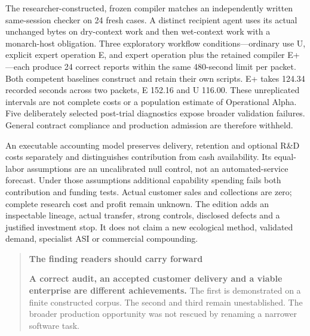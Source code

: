 \documentclass[11pt]{article}
\begin{document}
The researcher-constructed, frozen compiler matches an independently written same-session checker on 24 fresh cases. A distinct recipient agent uses its actual unchanged bytes on dry-context work and then wet-context work with a monarch-host obligation. Three exploratory workflow conditions---ordinary use U, explicit expert operation E, and expert operation plus the retained compiler E+---each produce 24 correct reports within the same 480-second limit per packet. Both competent baselines construct and retain their own scripts. E+ takes 124.34 recorded seconds across two packets, E 152.16 and U 116.00. These unreplicated intervals are not complete costs or a population estimate of Operational Alpha. Five deliberately selected post-trial diagnostics expose broader validation failures. General contract compliance and production admission are therefore withheld.

An executable accounting model preserves delivery, retention and optional R\&D costs separately and distinguishes contribution from cash availability. Its equal-labor assumptions are an uncalibrated null control, not an automated-service forecast. Under those assumptions additional capability spending fails both contribution and funding tests. Actual customer sales and collections are zero; complete research cost and profit remain unknown. The edition adds an inspectable lineage, actual transfer, strong controls, disclosed defects and a justified investment stop. It does not claim a new ecological method, validated demand, specialist ASI or commercial compounding.

\begin{quote}
\textbf{The finding readers should carry forward}


\textbf{A correct audit, an accepted customer delivery and a viable enterprise are different achievements.} The first is demonstrated on a finite constructed corpus. The second and third remain unestablished. The broader production opportunity was not rescued by renaming a narrower software task.
\end{quote}
\end{document}
